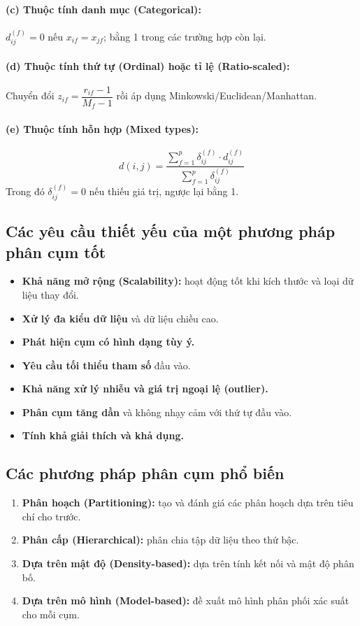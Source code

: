 \documentclass[10pt]{article}
\begin{document}
\paragraph{(c) Thuộc tính danh mục (Categorical):} $d_{ij}^{(f)} = 0$ nếu $x_{if} = x_{jf}$; bằng 1 trong các trường hợp còn lại.

\paragraph{(d) Thuộc tính thứ tự (Ordinal) hoặc tỉ lệ (Ratio-scaled):} Chuyển đổi $z_{if} = \dfrac{r_{if} - 1}{M_f - 1}$ rồi áp dụng Minkowski/Euclidean/Manhattan.

\paragraph{(e) Thuộc tính hỗn hợp (Mixed types):}
\[
d(i,j) = \frac{\sum_{f=1}^{p} \delta_{ij}^{(f)} \cdot d_{ij}^{(f)}}{\sum_{f=1}^{p} \delta_{ij}^{(f)}}
\]
Trong đó $\delta_{ij}^{(f)} = 0$ nếu thiếu giá trị, ngược lại bằng 1.

\subsection{Các yêu cầu thiết yếu của một phương pháp phân cụm tốt}

\begin{itemize}
    \item \textbf{Khả năng mở rộng (Scalability):} hoạt động tốt khi kích thước và loại dữ liệu thay đổi.
    \item \textbf{Xử lý đa kiểu dữ liệu} và dữ liệu chiều cao.
    \item \textbf{Phát hiện cụm có hình dạng tùy ý.}
    \item \textbf{Yêu cầu tối thiểu tham số} đầu vào.
    \item \textbf{Khả năng xử lý nhiễu và giá trị ngoại lệ (outlier).}
    \item \textbf{Phân cụm tăng dần} và không nhạy cảm với thứ tự đầu vào.
    \item \textbf{Tính khả giải thích và khả dụng.}
\end{itemize}

\subsection{Các phương pháp phân cụm phổ biến}

\begin{enumerate}
    \item \textbf{Phân hoạch (Partitioning):} tạo và đánh giá các phân hoạch dựa trên tiêu chí cho trước.
    \item \textbf{Phân cấp (Hierarchical):} phân chia tập dữ liệu theo thứ bậc.
    \item \textbf{Dựa trên mật độ (Density-based):} dựa trên tính kết nối và mật độ phân bố.
    \item \textbf{Dựa trên mô hình (Model-based):} đề xuất mô hình phân phối xác suất cho mỗi cụm.
\end{enumerate}
\end{document}
